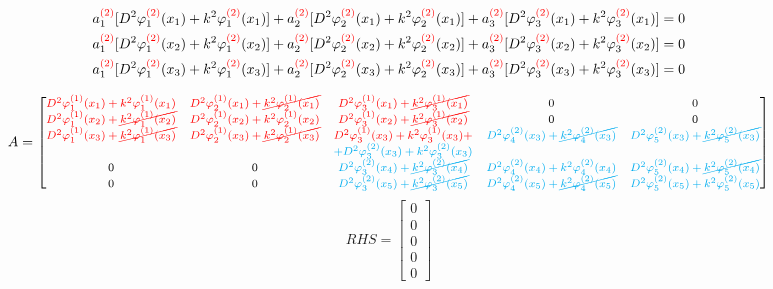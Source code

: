\documentclass[9pt, a4paper]{article}
\begin{document}
\begin{align*}
a_1^{\textcolor{red}{(2)}}[D^2\varphi_1^{\textcolor{red}{(2)}}(x_1)+k^2\varphi_1^{\textcolor{red}{(2)}}(x_1)]+a_2^{\textcolor{red}{(2)}}[D^2\varphi_2^{\textcolor{red}{(2)}}(x_1)+k^2\varphi_2^{\textcolor{red}{(2)}}(x_1)]+a_3^{\textcolor{red}{(2)}}[D^2\varphi_3^{\textcolor{red}{(2)}}(x_1)+k^2\varphi_3^{\textcolor{red}{(2)}}(x_1)]=0\\
a_1^{\textcolor{red}{(2)}}[D^2\varphi_1^{\textcolor{red}{(2)}}(x_2)+k^2\varphi_1^{\textcolor{red}{(2)}}(x_2)]+a_2^{\textcolor{red}{(2)}}[D^2\varphi_2^{\textcolor{red}{(2)}}(x_2)+k^2\varphi_2^{\textcolor{red}{(2)}}(x_2)]+a_3^{\textcolor{red}{(2)}}[D^2\varphi_3^{\textcolor{red}{(2)}}(x_2)+k^2\varphi_3^{\textcolor{red}{(2)}}(x_2)]=0\\
a_1^{\textcolor{red}{(2)}}[D^2\varphi_1^{\textcolor{red}{(2)}}(x_3)+k^2\varphi_1^{\textcolor{red}{(2)}}(x_3)]+a_2^{\textcolor{red}{(2)}}[D^2\varphi_2^{\textcolor{red}{(2)}}(x_3)+k^2\varphi_2^{\textcolor{red}{(2)}}(x_3)]+a_3^{\textcolor{red}{(2)}}[D^2\varphi_3^{\textcolor{red}{(2)}}(x_3)+k^2\varphi_3^{\textcolor{red}{(2)}}(x_3)]=0
\end{align*}

\[\footnotesize
A=
\begin{bmatrix}
\color{red}D^2\varphi_1^{(1)}(x_1)+k^2\varphi_1^{(1)}(x_1)&\color{red}D^2\varphi_2^{(1)}(x_1)+\cancel{k^2\varphi_2^{(1)}(x_1)}&\color{red}D^2\varphi_3^{(1)}(x_1)+\cancel{k^2\varphi_3^{(1)}(x_1)}&0&0\\
\color{red}D^2\varphi_1^{(1)}(x_2)+\cancel{k^2\varphi_1^{(1)}(x_2)}&\color{red}D^2\varphi_2^{(1)}(x_2)+k^2\varphi_2^{(1)}(x_2)&\color{red}D^2\varphi_3^{(1)}(x_2)+\cancel{k^2\varphi_3^{(1)}(x_2)}&0&0\\
\color{red}D^2\varphi_1^{(1)}(x_3)+\cancel{k^2\varphi_1^{(1)}(x_3)}&\color{red}D^2\varphi_2^{(1)}(x_3)+\cancel{k^2\varphi_2^{(1)}(x_3)}&\color{red}D^2\varphi_3^{(1)}(x_3)+k^2\varphi_3^{(1)}(x_3)+&\color{cyan}D^2\varphi_4^{(2)}(x_3)+\cancel{k^2\varphi_4^{(2)}(x_3)}&\color{cyan}D^2\varphi_5^{(2)}(x_3)+\cancel{k^2\varphi_5^{(2)}(x_3)}\\
& & \color{cyan}+D^2\varphi_3^{(2)}(x_3)+k^2\varphi_3^{(2)}(x_3)& &\\
0&0&\color{cyan}D^2\varphi_3^{(2)}(x_4)+\cancel{k^2\varphi_3^{(2)}(x_4)}&\color{cyan}D^2\varphi_4^{(2)}(x_4)+k^2\varphi_4^{(2)}(x_4)&\color{cyan}D^2\varphi_5^{(2)}(x_4)+\cancel{k^2\varphi_5^{(2)}(x_4)}\\
0&0&\color{cyan}D^2\varphi_3^{(2)}(x_5)+\cancel{k^2\varphi_3^{(2)}(x_5)}&\color{cyan}D^2\varphi_4^{(2)}(x_5)+\cancel{k^2\varphi_4^{(2)}(x_5)}&\color{cyan}D^2\varphi_5^{(2)}(x_5)+k^2\varphi_5^{(2)}(x_5)
\end{bmatrix}
\]
\[
RHS=
\begin{bmatrix}
0\\
0\\
0\\
0\\
0
\end{bmatrix}
\]
\end{document}
